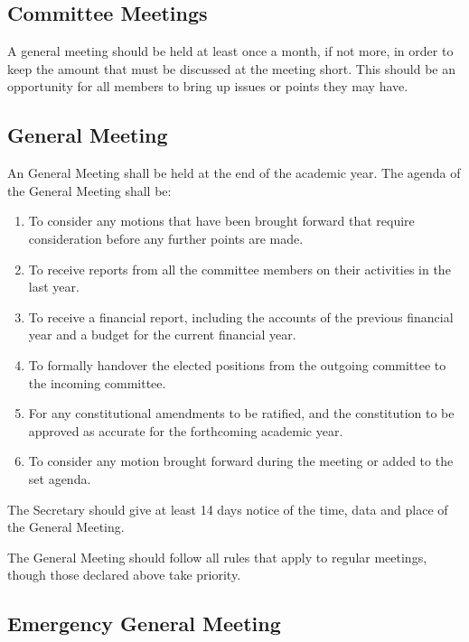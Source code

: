 \documentclass{report}
\begin{document}
	\subsection{Committee Meetings}
	
	A general meeting should be held at least once a month, if not more, in order to keep the amount that must be discussed at the meeting short. This should be an opportunity for all members to bring up issues or points they may have.

	\subsection{General Meeting}
	\label{agm}

	An General Meeting shall be held at the end of the academic year. The agenda of the General Meeting shall be:

	\begin{enumerate}
		\item To consider any motions that have been brought forward that require consideration before any further points are made.

		\item To receive reports from all the committee members on their activities in the last year.
		\item To receive a financial report, including the accounts of the previous financial year and a budget for the current financial year.
		\item To formally handover the elected positions from the outgoing committee to the incoming committee.
		\item For any constitutional amendments to be ratified, and the constitution to be approved as accurate for the forthcoming academic year.
		
		\item To consider any motion brought forward during the meeting or added to the set agenda.
	\end{enumerate}
	
	The Secretary should give at least 14 days notice of the time, data and place of the General Meeting.
	
	The General Meeting should follow all rules that apply to regular meetings, though those declared above take priority.	

	\subsection{Emergency General Meeting}
	
\end{document}
